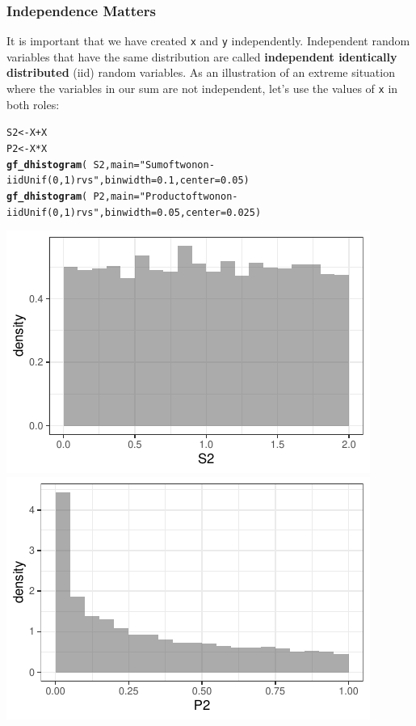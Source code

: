 \documentclass[twoside]{book}\usepackage[]{graphicx}\usepackage[]{xcolor}
\makeatletter
\def\maxwidth{ %
  \ifdim\Gin@nat@width>\linewidth
    \linewidth
  \else
    \Gin@nat@width
  \fi
}
\newcommand{\hlnum}[1]{\textcolor[rgb]{0.686,0.059,0.569}{#1}}%
\newcommand{\hlstr}[1]{\textcolor[rgb]{0.192,0.494,0.8}{#1}}%
\newcommand{\hlopt}[1]{\textcolor[rgb]{0,0,0}{#1}}%
\newcommand{\hlstd}[1]{\textcolor[rgb]{0.345,0.345,0.345}{#1}}%
\newcommand{\hlkwb}[1]{\textcolor[rgb]{0.69,0.353,0.396}{#1}}%
\newcommand{\hlkwc}[1]{\textcolor[rgb]{0.333,0.667,0.333}{#1}}%
\newcommand{\hlkwd}[1]{\textcolor[rgb]{0.737,0.353,0.396}{\textbf{#1}}}%
\newenvironment{kframe}{%
 \def\at@end@of@kframe{}%
 \ifinner\ifhmode%
  \def\at@end@of@kframe{\end{minipage}}%
  \begin{minipage}{\columnwidth}%
 \fi\fi%
 \def\FrameCommand##1{\hskip\@totalleftmargin \hskip-\fboxsep
 \colorbox{shadecolor}{##1}\hskip-\fboxsep
     \hskip-\linewidth \hskip-\@totalleftmargin \hskip\columnwidth}%
 \MakeFramed {\advance\hsize-\width
   \@totalleftmargin\z@ \linewidth\hsize
   \@setminipage}}%
 {\par\unskip\endMakeFramed%
 \at@end@of@kframe}
\newenvironment{knitrout}{}{} %
\def\term#1{\textbf{#1}}
\makeatother
\begin{document}
\subsubsection*{Independence Matters}
It is important that we have created \texttt{x} and \texttt{y} independently.
Independent random variables that have the same distribution are called 
\term{independent identically distributed} (iid) random variables.  As an illustration
of an extreme situation where the variables in our sum are not independent, let's 
use the values of \texttt{x} in both roles:

\begin{knitrout}
\color{fgcolor}\begin{kframe}
\begin{alltt}
\hlstd{S2} \hlkwb{<-} \hlstd{X} \hlopt{+} \hlstd{X}
\hlstd{P2} \hlkwb{<-} \hlstd{X} \hlopt{*} \hlstd{X}
\hlkwd{gf_dhistogram}\hlstd{(} \hlopt{~} \hlstd{S2 ,} \hlkwc{main} \hlstd{=} \hlstr{"Sum of two non-iid Unif(0,1) rvs"}\hlstd{,} \hlkwc{binwidth} \hlstd{=} \hlnum{0.1}\hlstd{,} \hlkwc{center} \hlstd{=} \hlnum{0.05}\hlstd{)}
\hlkwd{gf_dhistogram}\hlstd{(} \hlopt{~} \hlstd{P2 ,} \hlkwc{main} \hlstd{=} \hlstr{"Product of two non-iid Unif(0,1) rvs"}\hlstd{,} \hlkwc{binwidth} \hlstd{=} \hlnum{0.05}\hlstd{,} \hlkwc{center} \hlstd{=} \hlnum{0.025}\hlstd{)}
\end{alltt}
\end{kframe}

{\centering \includegraphics[width=\maxwidth]{figures/fig-sum-product-uniform-non-iid-1} 
\includegraphics[width=\maxwidth]{figures/fig-sum-product-uniform-non-iid-2} 

}
\end{knitrout}
\end{document}
